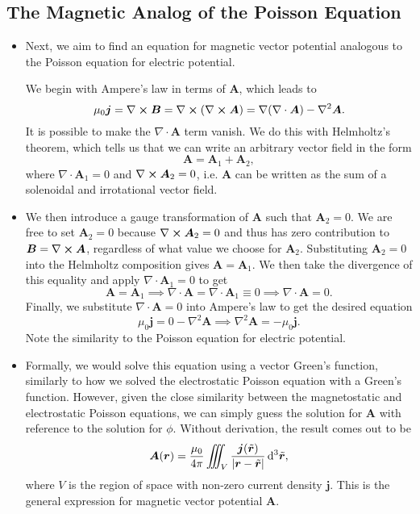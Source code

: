 \documentclass[11pt, a4paper]{article}
\newcommand{\diff}{\mathop{}\!\mathrm{d}} %
\newcommand{\dtr}{\diff^{3} \tilde{\r}}  %
\renewcommand{\vec}[1]{\bm{#1}} %
\renewcommand{\t}[1]{\tilde{#1}} %
\renewcommand{\r}{\vec{r}}
\newcommand{\B}{\vec{B}} %
\newcommand{\A}{\vec{A}} %
\newcommand{\mm}{\mu_{0}}  %
\renewcommand{\j}{\vec{j}}  %
\renewcommand{\div}{\nabla \cdot}
\renewcommand{\curl}{\nabla \cross}
\renewcommand{\grad}{\nabla}
\renewcommand{\laplacian}{\nabla^{2}}
\begin{document}
\subsection{The Magnetic Analog of the Poisson Equation}
\begin{itemize}
	\item Next, we aim to find an equation for magnetic vector potential analogous to the Poisson equation for electric potential. 

    We begin with Ampere's law in terms of $ \A $, which leads to
	\begin{equation*}
		\mm \j = \curl \B = \curl (\curl \A) = \grad (\div \A) - \laplacian \A.
	\end{equation*}
	It is possible to make the $ \div \A $ term vanish. We do this with Helmholtz's theorem, which tells us that we can write an arbitrary vector field in the form
	\begin{equation*}
		\A = \A_{1} + \A_{2},
	\end{equation*}
	where $ \div \A_{1} = 0 $ and $ \curl \A_{2} = 0 $, i.e. $ \A $ can be written as the sum of a solenoidal and irrotational vector field.
	
    \item We then introduce a gauge transformation of $ \A $ such that $ \A_{2} = 0 $. We are free to set $ \A_{2} = 0 $ because $ \curl \A_{2} = 0 $ and thus has zero contribution to $ \B = \curl \A $, regardless of what value we choose for $ \A_{2} $. Substituting $ \A_{2} = 0 $ into the Helmholtz composition gives $ \A = \A_{1} $. We then take the divergence of this equality and apply $ \div \A_{1} = 0 $ to get
    \begin{equation*}
        \A = \A_{1} \implies \div \A = \div \A_{1} \equiv 0 \implies \div \A = 0.
    \end{equation*}
    Finally, we substitute $ \div \A = 0 $ into Ampere's law to get the desired equation
    \begin{equation*}
        \mm \j = 0 - \laplacian \A \implies \laplacian \A = - \mm \j.
    \end{equation*}
	Note the similarity to the Poisson equation for electric potential.
	
    \item Formally, we would solve this equation using a vector Green's function, similarly to how we solved the electrostatic Poisson equation with a Green's function. However, given the close similarity between the magnetostatic and electrostatic Poisson equations, we can simply guess the solution for $ \A $ with reference to the solution for $ \phi $. Without derivation, the result comes out to be
	\begin{equation*}
		\A(\r) = \frac{\mm}{4\pi} \iiint_{V} \frac{\j(\t{\r})}{\abs{\r - \t{\r}}} \dtr,
	\end{equation*}
	where $ V $ is the region of space with non-zero current density $ \j $. This is the general expression for magnetic vector potential $ \A $. 
	

\end{itemize}
\end{document}
